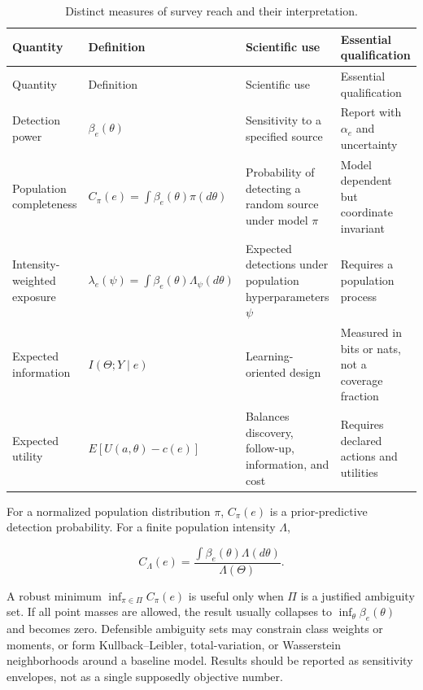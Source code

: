 \documentclass[11pt,a4paper]{article}
\begin{document}
\begin{longtable}[]{@{}Q{0.16\textwidth}Q{0.20\textwidth}Q{0.25\textwidth}Q{0.27\textwidth}@{}}
\caption{Distinct measures of survey reach and their interpretation.}\label{tab:reach}\\
\toprule\noalign{}
Quantity & Definition & Scientific use & Essential qualification \\
\midrule\noalign{}
\endfirsthead
\toprule\noalign{}
Quantity & Definition & Scientific use & Essential qualification \\
\midrule\noalign{}
\endhead
\bottomrule\noalign{}
\endlastfoot
Detection power & \(\beta_e(\theta)\) & Sensitivity to a specified source & Report with \(\alpha_e\) and uncertainty \\
Population completeness & \(C_\pi(e)=\int\beta_e(\theta)\pi(d\theta)\) & Probability of detecting a random source under model \(\pi\) & Model dependent but coordinate invariant \\
Intensity-weighted exposure & \(\lambda_e(\psi)=\int\beta_e(\theta)\Lambda_\psi(d\theta)\) & Expected detections under population hyperparameters \(\psi\) & Requires a population process \\
Expected information & \(I(\Theta;Y\mid e)\) & Learning-oriented design & Measured in bits or nats, not a coverage fraction \\
Expected utility & \(E[U(a,\theta)-c(e)]\) & Balances discovery, follow-up, information, and cost & Requires declared actions and utilities \\
\end{longtable}

For a normalized population distribution \(\pi\), \(C_\pi(e)\) is a prior-predictive detection probability. For a finite population intensity \(\Lambda\),

\begin{equation}
C_\Lambda(e)=
\frac{\int\beta_e(\theta)\Lambda(d\theta)}{\Lambda(\Theta)}.
\end{equation}

A robust minimum \(\inf_{\pi\in\Pi}C_\pi(e)\) is useful only when \(\Pi\) is a justified ambiguity set. If all point masses are allowed, the result usually collapses to \(\inf_\theta\beta_e(\theta)\) and becomes zero. Defensible ambiguity sets may constrain class weights or moments, or form Kullback--Leibler, total-variation, or Wasserstein neighborhoods around a baseline model. Results should be reported as sensitivity envelopes, not as a single supposedly objective number.
\end{document}
